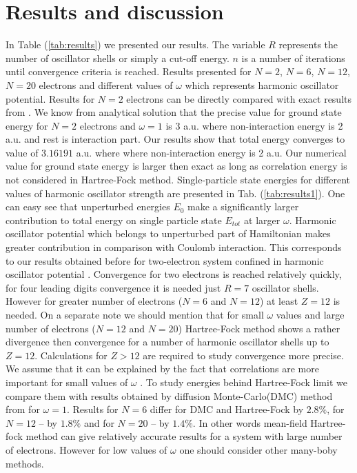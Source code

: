\documentclass[10pt]{article}
\begin{document}
\section{Results and discussion}\label{results}

In Table (\ref{tab:results}) we presented our results. The variable $R$ represents the number of oscillator shells or simply a cut-off energy. $n$ is a number of iterations until convergence criteria is reached. Results presented for $N=2$, $N=6$, $N=12$, $N=20$ electrons and different values of $\omega$ which represents harmonic oscillator potential.
Results for $N=2$ electrons can be directly compared with exact results from \cite{Taut}. We know from analytical solution that the precise value for ground state energy for $N=2$ electrons and $\omega=1$ is 3 a.u. where non-interaction energy is 2 a.u. and rest is interaction part. Our results show that total energy converges to value of $3.16191$ a.u. where where non-interaction energy is 2 a.u. Our numerical value for ground state energy is larger then exact as long as correlation energy is not considered in Hartree-Fock method.
Single-particle state energies for different values of harmonic oscillator strength are presented in Tab. (\ref{tab:results1}). One can easy see that unperturbed energies $E_0$ make a significantly larger contribution to total energy on single particle state $E_{tot}$ at larger $\omega$. Harmonic oscillator potential which belongs to unperturbed part of Hamiltonian makes greater contribution in comparison with  Coulomb interaction. This corresponds to our results obtained before for two-electron system confined in harmonic oscillator potential \cite{proj2}.
Convergence for two electrons is reached relatively quickly, for four leading digits convergence it is needed just $R=7$ oscillator shells. However for greater number of electrons  ($N=6$ and $N=12$) at least $Z=12$ is needed. On a separate note we should mention that for small $\omega$ values and large number of electrons ($N=12$ and $N=20$) Hartree-Fock method shows a rather divergence then convergence for a number of harmonic oscillator shells up to $Z=12$. Calculations for $Z > 12$ are required to study convergence more precise. We assume that it can be explained by the fact that correlations are more important for small values of $\omega$ \cite{Hjorth-Jensen}.
To study energies behind Hartree-Fock limit we compare them with results obtained by diffusion Monte-Carlo(DMC) method from \cite{Hjorth-Jensen} for $\omega=1$.
Results for $N=6$ differ for DMC and Hartree-Fock by $2.8\%$, for $N=12$ -- by $1.8\%$ and for $N=20$ -- by $1.4\%$. In other words mean-field Hartree-fock method can give relatively accurate results for a system with large number of electrons. However for low values of $\omega$ one should consider other many-boby methods.  
\end{document}
